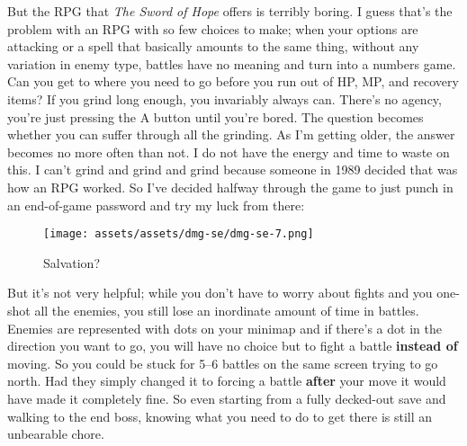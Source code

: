 \documentclass{book}
\let\oldcenter\center
\let\oldendcenter\endcenter
\renewenvironment{center}{\setlength\topsep{0pt}\oldcenter}{\oldendcenter}
\begin{document}
But the RPG that \emph{The Sword of Hope} offers is terribly boring. I guess that’s the problem with an RPG with so few choices to make; when your options are attacking or a spell that basically amounts to the same thing, without any variation in enemy type, battles have no meaning and turn into a numbers game. Can you get to where you need to go before you run out of HP, MP, and recovery items? If you grind long enough, you invariably always can. There’s no agency, you’re just pressing the A button until you’re bored. The question becomes whether you can suffer through all the grinding. As I’m getting older, the answer becomes no more often than not. I do not have the energy and time to waste on this. I can’t grind and grind and grind because someone in 1989 decided that was how an RPG worked. So I’ve decided halfway through the game to just punch in an end-of-game password and try my luck from there:

\begin{figure}[hbt]
\vskip 10pt
\centering \texttt{[image: assets/assets/dmg-se/dmg-se-7.png]}\par\pagetwodescription Salvation?
\vskip 6pt
\end{figure}

But it’s not very helpful; while you don’t have to worry about fights and you one-shot all the enemies, you still lose an inordinate amount of time in battles. Enemies are represented with dots on your minimap and if there’s a dot in the direction you want to go, you will have no choice but to fight a battle \textbf{instead of} moving. So you could be stuck for 5–6 battles on the same screen trying to go north. Had they simply changed it to forcing a battle \textbf{after} your move it would have made it completely fine. So even starting from a fully decked-out save and walking to the end boss, knowing what you need to do to get there is still an unbearable chore.

\begin{center}
\vspace{8pt}
\quad\vspace{4pt}
\end{center}
\end{document}
